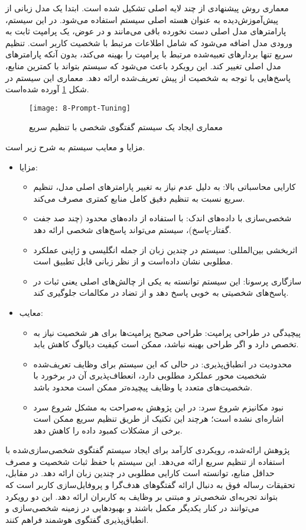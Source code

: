 \begin{enumerate}
معماری روش پیشنهادی%
\cite{kasahara2022building}
 از چند لایه اصلی تشکیل شده است. ابتدا یک مدل زبانی از پیش‌آموزش‌دیده به عنوان هسته اصلی سیستم استفاده می‌شود. در این سیستم، پارامترهای مدل اصلی دست نخورده باقی می‌مانند و در عوض، یک پرامپت ثابت به ورودی مدل اضافه می‌شود که شامل اطلاعات مرتبط با شخصیت کاربر است. تنظیم سریع تنها بردارهای تعبیه‌شده مرتبط با پرامپت را بهینه می‌کند، بدون آنکه پارامترهای مدل اصلی تغییر کند. این رویکرد باعث می‌شود که سیستم بتواند با کمترین منابع، پاسخ‌هایی با توجه به شخصیت از پیش تعریف‌شده ارائه دهد.
معماری این سیستم در شکل
\ref{fig:Prompt-Tuning}
آورده شده‌است.

\begin{figure}[ht]
	\centerline{\texttt{[image: 8-Prompt-Tuning]}}
		\caption{معماری ایجاد یک سیستم گفتگوی شخصی با تنظیم سریع 
			\cite{kasahara2022building}
	}
	\label{fig:Prompt-Tuning}
\end{figure}

مزایا و معایب سیستم به شرح زیر است.
\begin{itemize}
\item
مزایا:
\begin{itemize}
\item
کارایی محاسباتی بالا: به دلیل عدم نیاز به تغییر پارامترهای اصلی مدل، تنظیم سریع نسبت به تنظیم دقیق کامل منابع کمتری مصرف می‌کند.
\item
شخصی‌سازی با داده‌های اندک: با استفاده از داده‌های محدود (چند صد جفت گفتار-پاسخ)، سیستم می‌تواند پاسخ‌های شخصی ارائه دهد.
\item
اثربخشی بین‌المللی: سیستم در چندین زبان از جمله انگلیسی و ژاپنی عملکرد مطلوبی نشان داده‌است و از نظر زبانی قابل تطبیق است.
\item
سازگاری پرسونا: این سیستم توانسته به یکی از چالش‌های اصلی یعنی ثبات در پاسخ‌های شخصیتی به خوبی پاسخ دهد و از تضاد در مکالمات جلوگیری کند.
\end{itemize}


\item
معایب:
\begin{itemize}
\item
پیچیدگی در طراحی پرامپت: طراحی صحیح پرامپت‌ها برای هر شخصیت نیاز به تخصص دارد و اگر طراحی بهینه نباشد، ممکن است کیفیت دیالوگ کاهش یابد.
\item
محدودیت در انطباق‌پذیری: در حالی که این سیستم برای وظایف تعریف‌شده شخصیت محور عملکرد مطلوبی دارد، انعطاف‌پذیری آن در برخورد با شخصیت‌های متعدد یا وظایف پیچیده‌تر ممکن است محدود باشد.
\item
نبود مکانیزم شروع سرد: در این پژوهش به‌صراحت به مشکل شروع سرد اشاره‌ای نشده است؛ هرچند این تکنیک از طریق تنظیم سریع ممکن است برخی از مشکلات کمبود داده را کاهش دهد.
\end{itemize}
\end{itemize}
پژوهش ارائه‌شده، رویکردی کارآمد برای ایجاد سیستم گفتگوی شخصی‌سازی‌شده با استفاده از تنظیم سریع ارائه می‌دهد. این سیستم با حفظ ثبات شخصیت و مصرف حداقل منابع، توانسته است کارایی مطلوبی در چندین زبان ارائه دهد. در مقابل، تحقیقات رساله فوق به دنبال ارائه گفتگوهای هدف‌گرا و پروفایل‌سازی کاربر است که بتواند تجربه‌ای شخصی‌تر و مبتنی بر وظایف به کاربران ارائه دهد. این دو رویکرد می‌توانند در کنار یکدیگر مکمل باشند و بهبودهایی در زمینه شخصی‌سازی و انطباق‌پذیری گفتگوی هوشمند فراهم کنند.



\end{enumerate}
